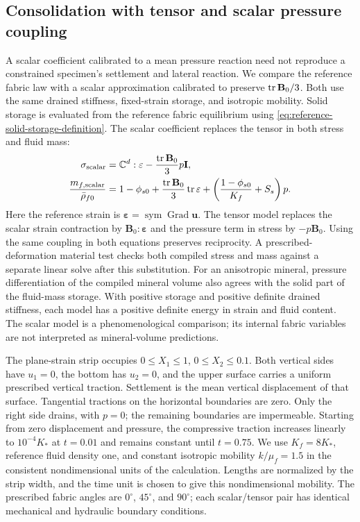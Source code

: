 \subsection{Consolidation with tensor and scalar pressure coupling}
\label{sec:fabric-scalar-comparison}

A scalar coefficient calibrated to a mean pressure reaction need not
reproduce a constrained specimen's settlement and lateral reaction.
We compare the reference fabric law with a scalar approximation calibrated
to preserve \(\operatorname{tr}\mathbf B_0/3\). Both use the same drained stiffness,
fixed-strain storage, and isotropic mobility. Solid storage is evaluated
from the reference fabric equilibrium using
\eqref{eq:reference-solid-storage-definition}. The scalar coefficient
replaces the tensor in both stress and fluid mass:
\begin{align}
 \mathbf\sigma_{\mathrm{scalar}}
 &=\mathbb C^d:\mathbf\varepsilon
       -\frac{\operatorname{tr}\mathbf B_0}{3}p\mathbf I,
 \label{eq:fabric-scalar-stress}\\
 \frac{m_{f,\mathrm{scalar}}}{\bar\rho_{f0}}
 &=1-\phi_{s0}+\frac{\operatorname{tr}\mathbf B_0}{3}\operatorname{tr}\mathbf\varepsilon
       +\left(\frac{1-\phi_{s0}}{K_f}+S_s\right)p.
 \label{eq:fabric-scalar-mass}
\end{align}
Here the reference strain is
\(\mathbf\varepsilon=\operatorname{sym}\operatorname{Grad}\mathbf u\).
The tensor model replaces the scalar strain contraction by
\(\mathbf B_0:\mathbf\varepsilon\) and the pressure term in stress by
\(-p\mathbf B_0\). Using the same coupling in both equations preserves
reciprocity. A prescribed-deformation material test checks both compiled
stress and mass against a separate linear solve after this substitution.
For an anisotropic mineral, pressure differentiation of the compiled
mineral volume also agrees with the solid part of the fluid-mass storage.
With positive storage and positive definite drained stiffness,
each model has a positive definite energy in strain and fluid content.
The scalar model is a phenomenological comparison; its internal fabric
variables are not interpreted as mineral-volume predictions.

The plane-strain strip occupies \(0\le X_1\le1\),
\(0\le X_2\le0.1\). Both vertical sides have \(u_1=0\), the bottom
has \(u_2=0\), and the upper surface carries a uniform prescribed vertical traction.
Settlement is the mean vertical displacement of that surface. Tangential
tractions on the horizontal boundaries are zero. Only the right side
drains, with \(p=0\); the remaining boundaries are impermeable.
Starting from zero displacement and pressure, the compressive traction
increases linearly to \(10^{-4}K_*\) at \(t=0.01\) and remains constant
until \(t=0.75\). We use \(K_f=8K_*\), reference fluid density one,
and constant isotropic mobility \(k/\mu_f=1.5\) in the consistent
nondimensional units of the calculation. Lengths are normalized by the
strip width, and the time unit is chosen to give this nondimensional
mobility. The prescribed fabric angles
are \(0^\circ\), \(45^\circ\), and \(90^\circ\); each scalar/tensor
pair has identical mechanical and hydraulic boundary conditions.

